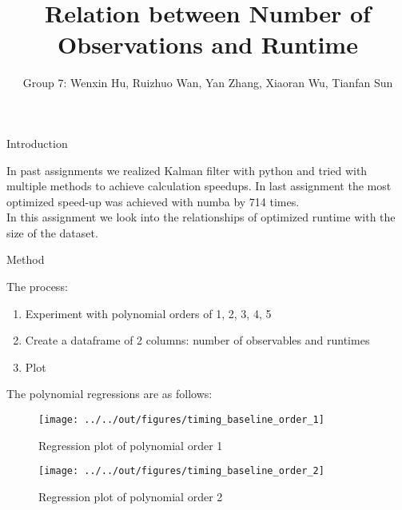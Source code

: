 \documentclass[11pt]{beamer}
\begin{document}
\title{Relation between Number of Observations and Runtime}

\author{Group 7: Wenxin Hu, Ruizhuo Wan, Yan Zhang, Xiaoran Wu, Tianfan Sun}


\begin{frame}
    \titlepage
    \note{~}
\end{frame}


\begin{frame}
        Introduction
\end{frame}


\begin{frame}
        In past assignments we realized Kalman filter with python and tried with multiple
        methods to achieve calculation speedups. In last assignment the most optimized speed-up was achieved with numba by 714 times. \\

        In this assignment we look into the relationships of optimized runtime with the size of the dataset.
\end{frame}


\begin{frame}
        Method
\end{frame}


\begin{frame}
        The process:
        \begin{enumerate}
                \item Experiment with polynomial orders of 1, 2, 3, 4, 5
                \item Create a dataframe of 2 columns: number of observables and runtimes
                \item Plot
        \end{enumerate}
\end{frame}


\begin{frame}
        The polynomial regressions are as follows:\\
        
\end{frame}


\begin{frame}
        \begin{figure}
    \caption{Regression plot of polynomial order 1}
    \texttt{[image: ../../out/figures/timing\_baseline\_order\_1]}
        \end{figure}
\end{frame}


\begin{frame}
        \begin{figure}
    \caption{Regression plot of polynomial order 2}
    \texttt{[image: ../../out/figures/timing\_baseline\_order\_2]}
        \end{figure}
\end{frame}
\end{document}
